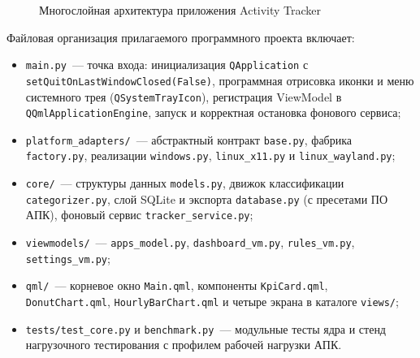\documentclass{timcw}
\begin{document}
\begin{figure}[H]
{%
}
\caption{Многослойная архитектура приложения Activity Tracker}
\label{fig:architecture}
\end{figure}

Файловая организация прилагаемого программного проекта включает:
\begin{itemize}
  \item \texttt{main.py}~--- точка входа: инициализация \texttt{QApplication} с \texttt{setQuitOnLastWindowClosed(False)}, программная отрисовка иконки и меню системного трея (\texttt{QSystemTrayIcon}), регистрация ViewModel в \texttt{QQmlApplicationEngine}, запуск и корректная остановка фонового сервиса;
  \item \texttt{platform\_adapters/}~--- абстрактный контракт \texttt{base.py}, фабрика \texttt{factory.py}, реализации \texttt{windows.py}, \texttt{linux\_x11.py} и \texttt{linux\_wayland.py};
  \item \texttt{core/}~--- структуры данных \texttt{models.py}, движок классификации \texttt{categorizer.py}, слой SQLite и экспорта \texttt{database.py} (с пресетами ПО АПК), фоновый сервис \texttt{tracker\_service.py};
  \item \texttt{viewmodels/}~--- \texttt{apps\_model.py}, \texttt{dashboard\_vm.py}, \texttt{rules\_vm.py}, \texttt{settings\_vm.py};
  \item \texttt{qml/}~--- корневое окно \texttt{Main.qml}, компоненты \texttt{KpiCard.qml}, \texttt{DonutChart.qml}, \texttt{HourlyBarChart.qml} и четыре экрана в каталоге \texttt{views/};
  \item \texttt{tests/test\_core.py} и \texttt{benchmark.py}~--- модульные тесты ядра и стенд нагрузочного тестирования с профилем рабочей нагрузки АПК.
\end{itemize}
\end{document}
